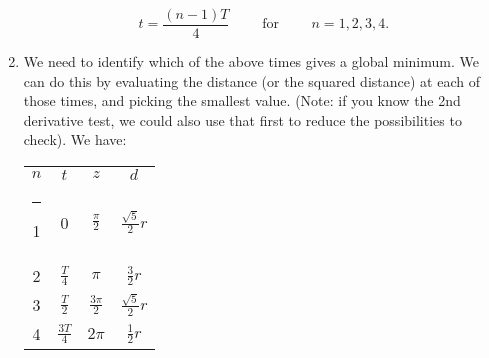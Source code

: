 \documentclass{article}
\makeatletter
\newcommand{\thickhline}{%
    \noalign {\ifnum 0=`}\fi \hrule height 2pt
    \futurelet \reserved@a \@xhline
}
\makeatother
\begin{document}
\begin{enumerate}
	\[t=\frac{(n-1)T}{4}\qquad\mbox{ for }\qquad n=1,2,3,4.\]
\item We need to identify which of the above times gives a global minimum. We can do this by evaluating the distance (or the squared distance) at each of those times, and picking the smallest value. (Note: if you know the 2nd derivative test, we could also use that first to reduce the possibilities to check). We have:
	\begin{center}
	\begin{tabular}{c|c|c|c}
	$n$ & $t$ & $z$ & $d$ \\ \thickhline
	1 & 0 & $\frac{\pi}{2}$ & $\frac{\sqrt{5}}{2}r$\\ \hline
	2 & $\frac{T}{4}$ & $\pi$ & $\frac{3}{2}r$\\ \hline
	3 & $\frac{T}{2}$ & $\frac{3\pi}{2}$ & $\frac{\sqrt{5}}{2}r$\\ \hline
	4 & $\frac{3T}{4}$ & $2\pi$ & $\frac{1}{2}r$
	\end{tabular}
	\end{center}
\end{enumerate}

\begin{center}
\end{center}
\end{document}
